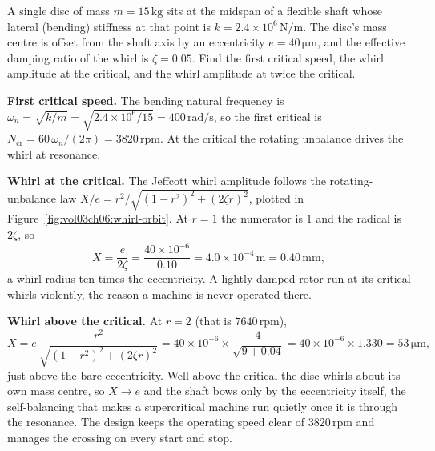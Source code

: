 A single disc of mass $m = 15\,\si{\kilogram}$ sits at the midspan of a
flexible shaft whose lateral (bending) stiffness at that point is
$k = 2.4\times 10^6\,\si{\newton\per\meter}$. The disc's mass centre is
offset from the shaft axis by an eccentricity $e = 40\,\si{\micro
\meter}$, and the effective damping ratio of the whirl is $\zeta = 0.05$.
Find the first critical speed, the whirl amplitude at the critical, and
the whirl amplitude at twice the critical.

\textbf{First critical speed.} The bending natural frequency is
$\omega_n = \sqrt{k/m} = \sqrt{2.4\times 10^6/15} = 400\,\si{\radian\per
\second}$, so the first critical is $N_{\text{cr}} = 60\,\omega_n/(2\pi)
= 3820\,\text{rpm}$. At the critical the rotating unbalance drives the
whirl at resonance.

\textbf{Whirl at the critical.} The Jeffcott whirl amplitude follows the
rotating-unbalance law $X/e = r^2/\sqrt{(1 - r^2)^2 + (2\zeta r)^2}$,
plotted in Figure~\ref{fig:vol03ch06:whirl-orbit}. At $r = 1$ the
numerator is $1$ and the radical is $2\zeta$, so
\[
X = \frac{e}{2\zeta} = \frac{40\times 10^{-6}}{0.10} = 4.0\times
10^{-4}\,\si{\meter} = 0.40\,\si{\milli\meter},
\]
a whirl radius ten times the eccentricity. A lightly damped rotor run at
its critical whirls violently, the reason a machine is never operated
there.



\textbf{Whirl above the critical.} At $r = 2$ (that is $7640\,\text{rpm}$),
\[
X = e\,\frac{r^2}{\sqrt{(1 - r^2)^2 + (2\zeta r)^2}} = 40\times 10^{-6}
\times\frac{4}{\sqrt{9 + 0.04}} = 40\times 10^{-6}\times 1.330 =
53\,\si{\micro\meter},
\]
just above the bare eccentricity. Well above the critical the disc
whirls about its own mass centre, so $X\to e$ and the shaft bows only by
the eccentricity itself, the self-balancing that makes a supercritical
machine run quietly once it is through the resonance. The design keeps
the operating speed clear of $3820\,\text{rpm}$ and manages the crossing
on every start and stop.

